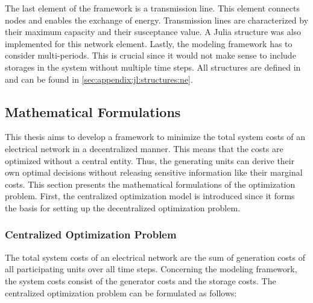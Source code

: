 

The last element of the framework is a transmission line. This element connects nodes and enables the exchange of energy. Transmission lines are characterized by their maximum capacity and their susceptance value. A Julia structure was also implemented for this network element. Lastly, the modeling framework has to consider multi-periods. This is crucial since it would not make sense to include storages in the system without multiple time steps. All structures are defined in  and can be found in \ref{sec:appendix:jl:structures:ne}.


\subsection{Mathematical Formulations}
\label{sec:app:math-form}

This thesis aims to develop a framework to minimize the total system costs of an electrical network in a decentralized manner. This means that the costs are optimized without a central entity. Thus, the generating units can derive their own optimal decisions without releasing sensitive information like their marginal costs. This section presents the mathematical formulations of the optimization problem. First, the centralized optimization model is introduced since it forms the basis for setting up the decentralized optimization problem.

\subsubsection{Centralized Optimization Problem}

The total system costs of an electrical network are the sum of generation costs of all participating units over all time steps. Concerning the modeling framework, the system costs consist of the generator costs and the storage costs. The centralized optimization problem can be formulated as follows:

